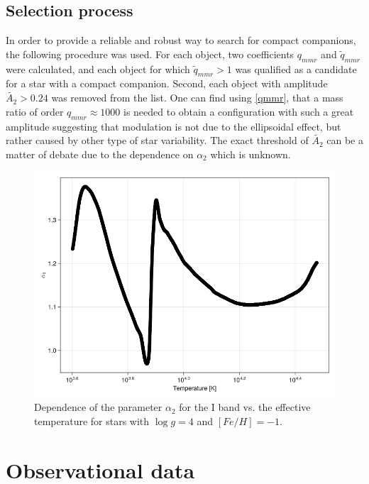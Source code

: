 \documentclass{pracalicmgr}
\begin{document}
\section{Selection process}
In order to provide  a reliable and robust way to search for compact companions, the following procedure was used.
For each object, two coefficients $q_{mmr}$ and $\tilde{q}_{mmr}$ were calculated, and each object for which $\tilde{q}_{mmr}>1$ was qualified as a candidate for a star with a compact companion.
Second, each object with amplitude $\tilde{A_2}>0.24$ was removed from the list. One can find using \ref{qmmr}, that a mass ratio of order $q_{mmr}\approx 1000$ is needed
to obtain a configuration with such a great amplitude
suggesting that modulation is not due to the ellipsoidal effect, but rather caused by other type of star variability.
The exact threshold of $\tilde{A_2}$ can be a matter of debate due to the dependence on $\alpha_2$ which is unknown. 
\begin{figure}[H]
    \centering
    \includegraphics[scale=0.4]{plots/A_2_dependence.png}
    \caption{Dependence of the parameter $\alpha_2$ for the I band vs. the effective temperature for stars with $\log g = 4$ and $[Fe/H] = -1$.}
    \label{claret}
\end{figure}

\chapter{Observational data}
\end{document}
